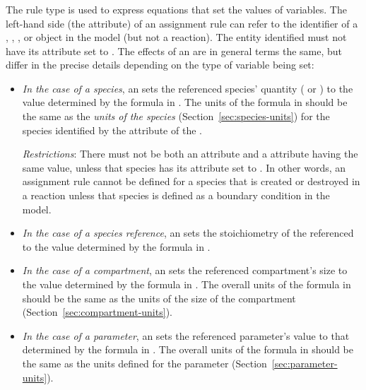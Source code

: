 \subsubsection{}
\label{sec:assignmentrule}

The rule type \AssignmentRule is used to express equations that
set the values of variables.  The left-hand side (the
 attribute) of an assignment rule can refer to the
identifier of a \Species, \SpeciesReference, \Compartment, 
or \Parameter object in
the model (but not a reaction).  The entity identified must not
have its  attribute set to .  The effects of
an \AssignmentRule are in general terms the same, but differ in
the precise details depending on the type of variable being set:

\begin{itemize}
  
\item \emph{In the case of a species}, an \AssignmentRule sets the
  referenced species' quantity ( or
  ) to the value determined by the
  formula in .  The units of the formula in
   should be the same as the \emph{units of the species}
  (Section~\ref{sec:species-units}) for the species identified by
  the  attribute of the \AssignmentRule.
  
  \emph{Restrictions}: There must not be both an \AssignmentRule
   attribute and a \SpeciesReference {}
  attribute having the same value, unless that species has its
   attribute set to .  In other
  words, an assignment rule cannot be defined for a species that
  is created or destroyed in a reaction unless that species is
  defined as a boundary condition in the model.

\item \emph{In the case of a species reference}, an \AssignmentRule sets
  the stoichiometry of the referenced \SpeciesReference to the value 
  determined by the formula in .

\item \emph{In the case of a compartment}, an \AssignmentRule sets
  the referenced compartment's size to the value determined by the
  formula in .  The overall units of the formula in
   should be the same as the units of the size of the
  compartment (Section~\ref{sec:compartment-units}).
  
\item \emph{In the case of a parameter}, an \AssignmentRule sets
  the referenced parameter's value to that determined by the
  formula in .  The overall units of the formula in
   should be the same as the units defined for the
  parameter (Section~\ref{sec:parameter-units}).

\end{itemize}

